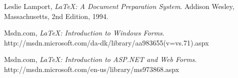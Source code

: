 \begin{thebibliography}{9}
  Leslie Lamport,
  \emph{\LaTeX: A Document Preparation System}.
  Addison Wesley, Massachusetts,
  2nd Edition,
  1994.


  Msdn.com,
  \emph{\LaTeX: Introduction to Windows Forms}.
  http://msdn.microsoft.com/da-dk/library/aa983655(v=vs.71).aspx

  Msdn.com,
  \emph{\LaTeX: Introduction to ASP.NET and Web Forms}.
  http://msdn.microsoft.com/en-us/library/ms973868.aspx
\end{thebibliography}









